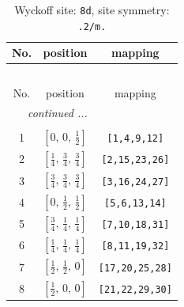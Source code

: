 \documentclass[fleqn,8pt]{jsarticle}
\begin{document}
\begin{longtable}{ccc}
\caption{Wyckoff site: {\tt 8d}, site symmetry: {\tt .2/m.}}
 \\
 \hline \hline
No. & position & mapping \\ \hline \endfirsthead

\multicolumn{2}{l}{\tablename\ \thetable{}} \\
 \hline \hline
No. & position & mapping \\ \hline \endhead

 \hline \hline
\multicolumn{2}{r}{\footnotesize\it continued ...} \\ \endfoot

 \hline \hline
\multicolumn{2}{r}{} \\ \endlastfoot

1 & $\left[ 0,\, 0,\, \frac{1}{2} \right]$ & {\tt [1,4,9,12]} \\ \hline
2 & $\left[ \frac{1}{4},\, \frac{3}{4},\, \frac{3}{4} \right]$ & {\tt [2,15,23,26]} \\ \hline
3 & $\left[ \frac{3}{4},\, \frac{3}{4},\, \frac{3}{4} \right]$ & {\tt [3,16,24,27]} \\ \hline
4 & $\left[ 0,\, \frac{1}{2},\, \frac{1}{2} \right]$ & {\tt [5,6,13,14]} \\ \hline
5 & $\left[ \frac{3}{4},\, \frac{1}{4},\, \frac{1}{4} \right]$ & {\tt [7,10,18,31]} \\ \hline
6 & $\left[ \frac{1}{4},\, \frac{1}{4},\, \frac{1}{4} \right]$ & {\tt [8,11,19,32]} \\ \hline
7 & $\left[ \frac{1}{2},\, \frac{1}{2},\, 0 \right]$ & {\tt [17,20,25,28]} \\ \hline
8 & $\left[ \frac{1}{2},\, 0,\, 0 \right]$ & {\tt [21,22,29,30]} \\
\end{longtable}
\renewcommand{\arraystretch}{1.2}
\end{document}
